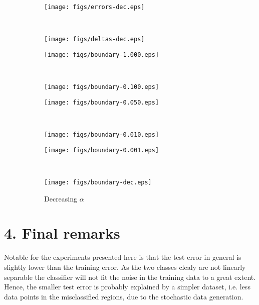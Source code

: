 \documentclass{article}
\begin{document}
\begin{figure}[ht]
    \centering
    \begin{subfigure}{0.48\textwidth}
        \centering
        \texttt{[image: figs/errors-dec.eps]}
        \caption{}
    \end{subfigure}
    ~
    \centering
    \begin{subfigure}{0.48\textwidth}
        \centering
        \texttt{[image: figs/deltas-dec.eps]}
        \caption{}
    \end{subfigure}
    \caption{}
\end{figure}

\begin{figure}[ht]
    \centering
    \begin{subfigure}{0.48\textwidth}
        \centering
        \texttt{[image: figs/boundary-1.000.eps]}
        \caption{}
    \end{subfigure}
    ~
    \begin{subfigure}{0.48\textwidth}
        \centering
        \texttt{[image: figs/boundary-0.100.eps]}
        \caption{}
    \end{subfigure}
    
    \begin{subfigure}{0.48\textwidth}
        \centering
        \texttt{[image: figs/boundary-0.050.eps]}
        \caption{}
    \end{subfigure}
    ~
    \begin{subfigure}{0.48\textwidth}
        \centering
        \texttt{[image: figs/boundary-0.010.eps]}
        \caption{}
    \end{subfigure}
   
    \begin{subfigure}{0.48\textwidth}
        \centering
        \texttt{[image: figs/boundary-0.001.eps]}
        \caption{}
    \end{subfigure}
    ~
    \begin{subfigure}{0.48\textwidth}
        \centering
        \texttt{[image: figs/boundary-dec.eps]}
        \caption{Decreasing $\alpha$}
    \end{subfigure}
    \caption{}
    \label{fig:boundary}
\end{figure}

\section*{4. Final remarks}
Notable for the experiments presented here is that the test error in general is slightly lower than the training error. As the two classes clealy are not linearly separable the classifier will not fit the noise in the training data to a great extent. Hence, the smaller test error is probably explained by a simpler dataset, i.e. less data points in the misclassified regions, due to the stochastic data generation.
\end{document}
